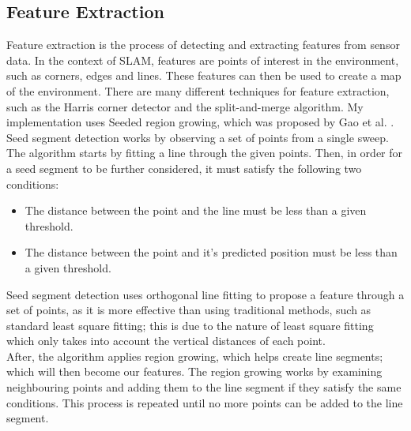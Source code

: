 \documentclass[12pt]{article}
\begin{document}
\subsection{Feature Extraction}
Feature extraction is the process of detecting and extracting features from sensor data. In the context of SLAM, features
are points of interest in the environment, such as corners, edges and lines. These features can then be used to create a map
of the environment. There are many different techniques for feature extraction, such as the Harris corner detector and the
split-and-merge algorithm. My implementation uses Seeded region growing, which was proposed by Gao et al.
\cite{seeded_region_growing}.\\
Seed segment detection works by observing a set of points from a single sweep. The algorithm starts by fitting a line through
the given points. Then, in order for a seed segment to be further considered, it must satisfy the following two conditions:
\begin{itemize}
    \item The distance between the point and the line must be less than a given threshold.
    \item The distance between the point and it's predicted position must be less than a given threshold.
\end{itemize}
Seed segment detection uses orthogonal line fitting to propose a feature through a set of points, as it is more effective
than using traditional methods, such as standard least square fitting; this is due to the nature of least square fitting
which only takes into account the vertical distances of each point.\\
After, the algorithm applies region growing, which helps create line segments; which will then become our features. The
region growing works by examining neighbouring points and adding them to the line segment if they satisfy the same conditions.
This process is repeated until no more points can be added to the line segment.\\
\end{document}
